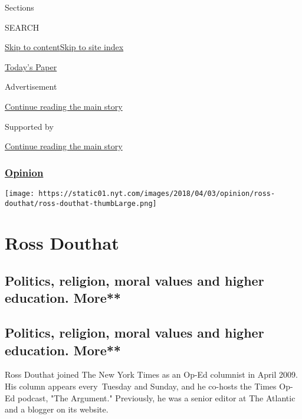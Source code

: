 Sections

SEARCH

\protect\hyperlink{site-content}{Skip to
content}\protect\hyperlink{site-index}{Skip to site index}

\href{https://myaccount.nytimes.com/auth/login?response_type=cookie\&client_id=vi}{}

\href{https://www.nytimes.com/section/todayspaper}{Today's Paper}

Advertisement

\protect\hyperlink{after-top}{Continue reading the main story}

Supported by

\protect\hyperlink{after-sponsor}{Continue reading the main story}

\hypertarget{opinion}{%
\subsubsection{\texorpdfstring{\href{/section/opinion}{Opinion}}{Opinion}}\label{opinion}}

\texttt{[image: https://static01.nyt.com/images/2018/04/03/opinion/ross-douthat/ross-douthat-thumbLarge.png]}

\hypertarget{ross-douthat}{%
\section{Ross Douthat}\label{ross-douthat}}

\hypertarget{politics-religion-moral-values-and-higher-education-more}{%
\subsection{Politics, religion, moral values and higher education.
More**}\label{politics-religion-moral-values-and-higher-education-more}}

\hypertarget{politics-religion-moral-values-and-higher-education-more-1}{%
\subsection{Politics, religion, moral values and higher education.
More**}\label{politics-religion-moral-values-and-higher-education-more-1}}

Ross Douthat joined The New York Times as an Op-Ed columnist in April
2009. His column appears every~Tuesday and Sunday, and he co-hosts the
Times Op-Ed podcast, "The Argument." Previously, he was a senior editor
at The Atlantic and a blogger on its website.~

